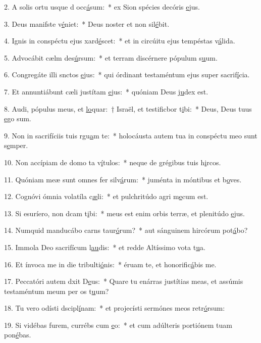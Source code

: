 2. A solis ortu usque d occ\uline{á}sum:~* ex Sion spécies decóris \uline{e}jus.\par 
3. Deus manifste v\uline{é}niet:~* Deus noster et non sil\uline{é}bit.\par 
4. Ignis in conspéctu ejus xard\uline{é}scet:~* et in circúitu ejus tempéstas v\uline{á}lida.\par 
5. Advocábit cælm des\uline{ú}rsum:~* et terram discérnere pópulum s\uline{u}um.\par 
6. Congregáte illi snctos \uline{e}jus:~* qui órdinant testaméntum ejus super sacrif\uline{í}cia.\par 
7. Et annuntiábunt cæli justítam \uline{e}jus:~* quóniam Deus j\uline{u}dex est.\par 
8. Audi, pópulus meus, et \uline{lo}quar:~† Israël, et testificbor t\uline{i}bi:~* Deus, Deus tuus \uline{e}go sum.\par 
9. Non in sacrifíciis tuis rgu\uline{a}m te:~* holocáusta autem tua in conspéctu meo sunt s\uline{e}mper.\par 
10. Non accípiam de domo ta v\uline{í}tulos:~* neque de grégibus tuis h\uline{i}rcos.\par 
11. Quóniam meæ sunt omnes fer silv\uline{á}rum:~* juménta in móntibus et b\uline{o}ves.\par 
12. Cognóvi ómnia volatíla c\uline{æ}li:~* et pulchritúdo agri m\uline{e}cum est.\par 
13. Si esuríero, non dcam t\uline{i}bi:~* meus est enim orbis terræ, et plenitúdo \uline{e}jus.\par 
14. Numquid manducábo carns taur\uline{ó}rum?~* aut sánguinem hircórum pot\uline{á}bo?\par 
15. Immola Deo sacrifícum l\uline{au}dis:~* et redde Altíssimo vota t\uline{u}a.\par 
16. Et ínvoca me in die tribulti\uline{ó}nis:~* éruam te, et honorific\uline{á}bis me.\par 
17. Peccatóri autem dxit D\uline{e}us:~* Quare tu enárras justítias meas, et assúmis testaméntum meum per os t\uline{u}um?\par 
18. Tu vero odísti dscipl\uline{í}nam:~* et projecísti sermónes meos retr\uline{ó}rsum:\par 
19. Si vidébas furem, currébs cum \uline{e}o:~* et cum adúlteris portiónem tuam pon\uline{é}bas.\par 
